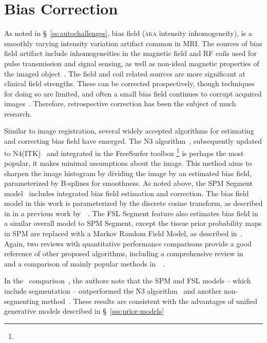 \section{Bias Correction}\label{s:pre-bias}
As noted in \S~\ref{ss:autochallenges}, bias field (\textsc{aka} intensity inhomogeneity),
is a smoothly varying intensity variation artifact common in MRI.
The sources of bias field artifact include
inhomogeneities in the magnetic field and RF coils used for pulse transmission and signal sensing,
as well as non-ideal magnetic properties of the imaged object~\cite{Vovk2007}.
The field and coil related sources are more significant at clinical field strengths.
These can be corrected prospectively, though techniques for doing so are limited,
and often a small bias field continues to corrupt acquired images~\cite{Vovk2007}.
Therefore, retrospective correction has been the subject of much research.
\par
Similar to image registration,
several widely accepted algorithms for estimating and correcting bias field have emerged.
The N3 algorithm~\cite{Sled1998}, subsequently updated to N4(ITK)~\cite{Tustison2010}
and integrated in the FreeSurfer toolbox%
\footnote{}
is perhaps the most popular, it makes minimal assumptions about the image.
This method aims to sharpen the image histogram by dividing the image by an estimated bias field,
parameterized by B-splines for smoothness.
As noted above, the SPM Segment model~\cite{Ashburner2005} 
includes integrated bias field estimation and correction.
The bias field model in this work is parameterized by the discrete cosine transform,
as described in in a previous work by~\citeauthor{Ashburner2005}~\cite{Ashburner1999}.
The FSL Segment feature also estimates bias field in a similar overall model to SPM Segment,
except the tissue prior probability maps in SPM are replaced with a Markov Random Field Model,
as described in~\cite{Zhang2001}.
Again, two reviews with quantitative performance comparisons
provide a good reference of other proposed algorithms,
including a comprehensive review in~\citeyear{Belaroussi2006}~\cite{Belaroussi2006}
and a comparison of mainly popular methods in~\citeyear{Ganzetti2016}~\cite{Ganzetti2016}.
\par
In the~\citeyear{Ganzetti2016} comparison~\cite{Ganzetti2016},
the authors note that the SPM and FSL models -- which include segmentation --
outperformed the N3 algorithm~\cite{Sled1998} and another non-segmenting method~\cite{Dawant1993}.
These results are consistent with
the advantages of unified generative models described in \S~\ref{sss:prior-models}

